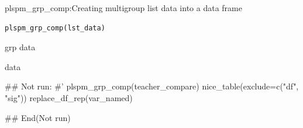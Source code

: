 \documentclass[a4paper]{book}
\begin{document}
%
\begin{Description}
plspm\_grp\_comp:Creating multigroup list data into a data frame
\end{Description}
%
\begin{Usage}
\begin{verbatim}
plspm_grp_comp(lst_data)
\end{verbatim}
\end{Usage}
%
\begin{Arguments}
\begin{ldescription}
\item[\code{lst\_data}] grp data
\end{ldescription}
\end{Arguments}
%
\begin{Value}
data
\end{Value}
%
\begin{Examples}
\begin{ExampleCode}

\#\# Not run: 
#'
plspm_grp_comp(teacher_compare) %
  nice_table(exclude=c("df", "sig"))%
  replace_df_rep(var_named) %

## End(Not run)

\end{ExampleCode}
\end{Examples}
\end{document}
